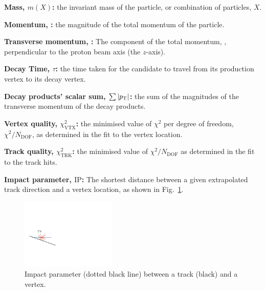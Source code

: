 \begin{description}
\item \textbf{Mass, $m(X)$:} the invariant mass of the particle, or combination of particles, $X$. 
\item \textbf{Momentum, \ptot:} the magnitude of the total momentum of the particle.
\item \textbf{Transverse momentum, \pt:} The component of the total momentum, \ptot, perpendicular to the proton beam axis (the $z$-axis).
\item \textbf{Decay Time, $\tau$:} the time taken for the candidate to travel from its production vertex to its decay vertex.
\item \textbf{Decay products' \pt scalar sum, $\sum{|\pt|}$:} the sum of the magnitudes of the transverse momentum of the decay products.
\item \textbf{Vertex quality, $\chi^{2}_{\text{VTX}}$:} the minimised value of $\chi^{2}$ per degree of freedom, $\chi^{2}/N_{\text{DOF}}$, as determined in the fit to the vertex location.
\item \textbf{Track quality, $\chi^{2}_{\text{TRK}}$:} the minimised value of $\chi^{2}/N_{\text{DOF}}$ as determined in the fit to the track hits.
\item \textbf{Impact parameter, $\text{IP}$:} The shortest distance between a given extrapolated track direction and a vertex location, as shown in Fig.~\ref{fig:impact_parameter}. 

\begin{figure}[!h]
    \centering
    \includegraphics[width=0.4\textwidth]{figs/Selection/Impact_parameter.pdf}
    \caption{Impact parameter (dotted black line) between a track (black) and a vertex.}
    \label{fig:impact_parameter}   
\end{figure}


\end{description}
